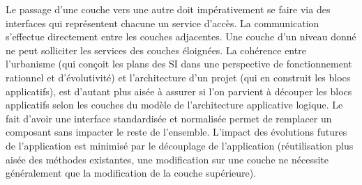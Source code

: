 \documentclass[12pt,a4paper]{article}
\begin{document}
\medbreak
Le passage d’une couche vers une autre doit impérativement se faire via des interfaces qui représentent chacune un service d’accès. La communication s’effectue directement entre les couches adjacentes. Une couche d’un niveau donné ne peut solliciter les services des couches éloignées.
La cohérence entre l’urbanisme (qui conçoit les plans des SI dans une perspective de fonctionnement rationnel et d’évolutivité) et l’architecture d’un projet (qui en construit les blocs applicatifs), est d’autant plus aisée à assurer si l’on parvient à découper les blocs applicatifs selon les couches du modèle de l’architecture applicative logique.
\smallbreak
Le fait d’avoir une interface standardisée et normalisée permet de remplacer un composant sans impacter le reste de l’ensemble. L’impact des évolutions futures de l’application est minimisé par le découplage de l’application (réutilisation plus aisée des méthodes existantes, une modification sur une couche ne nécessite généralement que la modification de la couche supérieure).
\clearpage
\newpage
\end{document}

